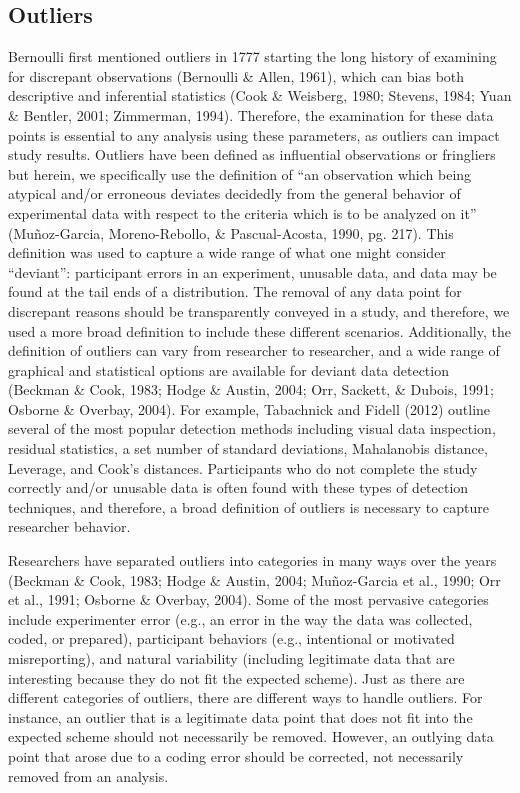 \documentclass[english,,man]{apa6}
\begin{document}
\hypertarget{outliers}{%
\subsection{Outliers}\label{outliers}}

Bernoulli first mentioned outliers in 1777 starting the long history of examining for discrepant observations (Bernoulli \& Allen, 1961), which can bias both descriptive and inferential statistics (Cook \& Weisberg, 1980; Stevens, 1984; Yuan \& Bentler, 2001; Zimmerman, 1994). Therefore, the examination for these data points is essential to any analysis using these parameters, as outliers can impact study results. Outliers have been defined as influential observations or fringliers but herein, we specifically use the definition of \enquote{an observation which being atypical and/or erroneous deviates decidedly from the general behavior of experimental data with respect to the criteria which is to be analyzed on it} (Muñoz-Garcia, Moreno-Rebollo, \& Pascual-Acosta, 1990, pg. 217). This definition was used to capture a wide range of what one might consider \enquote{deviant}: participant errors in an experiment, unusable data, and data may be found at the tail ends of a distribution. The removal of any data point for discrepant reasons should be transparently conveyed in a study, and therefore, we used a more broad definition to include these different scenarios. Additionally, the definition of outliers can vary from researcher to researcher, and a wide range of graphical and statistical options are available for deviant data detection (Beckman \& Cook, 1983; Hodge \& Austin, 2004; Orr, Sackett, \& Dubois, 1991; Osborne \& Overbay, 2004). For example, Tabachnick and Fidell (2012) outline several of the most popular detection methods including visual data inspection, residual statistics, a set number of standard deviations, Mahalanobis distance, Leverage, and Cook's distances. Participants who do not complete the study correctly and/or unusable data is often found with these types of detection techniques, and therefore, a broad definition of outliers is necessary to capture researcher behavior.

Researchers have separated outliers into categories in many ways over the years (Beckman \& Cook, 1983; Hodge \& Austin, 2004; Muñoz-Garcia et al., 1990; Orr et al., 1991; Osborne \& Overbay, 2004). Some of the most pervasive categories include experimenter error (e.g., an error in the way the data was collected, coded, or prepared), participant behaviors (e.g., intentional or motivated misreporting), and natural variability (including legitimate data that are interesting because they do not fit the expected scheme). Just as there are different categories of outliers, there are different ways to handle outliers. For instance, an outlier that is a legitimate data point that does not fit into the expected scheme should not necessarily be removed. However, an outlying data point that arose due to a coding error should be corrected, not necessarily removed from an analysis.
\end{document}
